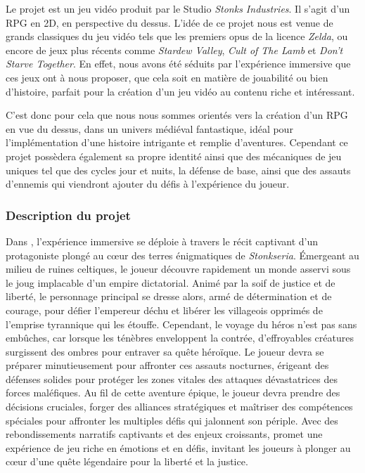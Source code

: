 
\vspace*{0.2cm}

Le projet \textit{\gameName} est un jeu vidéo produit par le Studio \textit{Stonks Industries}. Il s’agit d’un RPG en 2D, en perspective du dessus. L’idée de ce projet nous est venue de grands classiques du jeu vidéo tels que les premiers opus de la licence \textit{Zelda}, ou encore de jeux plus récents comme \textit{Stardew Valley}, \textit{Cult of The Lamb} et \textit{Don’t Starve Together}. En effet, nous avons été séduits par l'expérience immersive que ces jeux ont à nous proposer, que cela soit en matière de jouabilité ou bien d’histoire, parfait pour la création d’un jeu vidéo au contenu riche et intéressant. 

C’est donc pour cela que nous nous sommes orientés vers la création d’un RPG en vue du dessus, dans un univers médiéval fantastique, idéal pour l’implémentation d’une histoire intrigante et remplie d’aventures. Cependant ce projet possèdera également sa propre identité ainsi que des mécaniques de jeu uniques tel que des cycles jour et nuits, la défense de base, ainsi que des assauts d’ennemis qui viendront ajouter du défis à l'expérience du joueur.

\subsubsection*{\hspace*{0.6cm}Description du projet}

Dans \textit{\gameName}, l'expérience immersive se déploie à travers le récit captivant d'un protagoniste plongé au cœur des terres énigmatiques de \textit{Stonkseria}. Émergeant au milieu de ruines celtiques, le joueur découvre rapidement un monde asservi sous le joug implacable d'un empire dictatorial. Animé par la soif de justice et de liberté, le personnage principal se dresse alors, armé de détermination et de courage, pour défier l'empereur déchu et libérer les villageois opprimés de l'emprise tyrannique qui les étouffe.
Cependant, le voyage du héros n'est pas sans embûches, car lorsque les ténèbres enveloppent la contrée, d'effroyables créatures surgissent des ombres pour entraver sa quête héroïque. Le joueur devra se préparer minutieusement pour affronter ces assauts nocturnes, érigeant des défenses solides pour protéger les zones vitales des attaques dévastatrices des forces maléfiques.
Au fil de cette aventure épique, le joueur devra prendre des décisions cruciales, forger des alliances stratégiques et maîtriser des compétences spéciales pour affronter les multiples défis qui jalonnent son périple. Avec des rebondissements narratifs captivants et des enjeux croissants, \textit{\gameName} promet une expérience de jeu riche en émotions et en défis, invitant les joueurs à plonger au cœur d'une quête légendaire pour la liberté et la justice.


